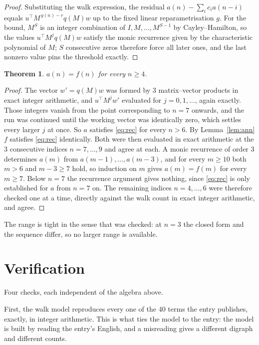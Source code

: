 \documentclass[11pt,a4paper]{article}
\theoremstyle{plain}
\newtheorem{theorem}{Theorem}
\theoremstyle{definition}
\begin{document}
\begin{proof}
Substituting the walk expression, the residual $a(n)-\sum_ic_ia(n-i)$ equals
$u^{\!\top}M^{\,g(n)-r}q(M)w$ up to the fixed linear reparametrisation $g$. For the bound,
$M^{S}$ is an integer combination of $I,M,\dots,M^{S-1}$ by Cayley--Hamilton, so the values
$u^{\!\top}M^{j}q(M)w$ satisfy the monic recurrence given by the characteristic polynomial of
$M$; $S$ consecutive zeros therefore force all later ones, and the last nonzero value pins the
threshold exactly.
\end{proof}

\begin{theorem}
$a(n)=f(n)$ for every $n\ge4$.
\end{theorem}

\begin{proof}
The vector $w'=q(M)w$ was formed by $3$ matrix--vector products in exact integer
arithmetic, and $u^{\!\top}M^{j}w'$ evaluated for $j=0,1,\dots$, again exactly. Those integers
vanish from the point corresponding to $n=7$ onwards, and the run was continued until the
working vector was identically zero, which settles every larger $j$ at once. So $a$ satisfies
\eqref{eq:rec} for every $n>6$. By Lemma~\ref{lem:ann} $f$ satisfies \eqref{eq:rec}
identically. Both were then evaluated in exact arithmetic at the $3$ consecutive indices
$n=7,\dots,9$ and agree at each. A monic recurrence of order $3$
determines $a(m)$ from $a(m-1),\dots,a(m-3)$, and for every $m\ge10$ both
$m>6$ and $m-3\ge7$ hold, so induction on $m$ gives $a(m)=f(m)$ for every
$m\ge7$.
Below $n=7$ the recurrence argument gives nothing, since \eqref{eq:rec} is only
established for $a$ from $n=7$ on. The remaining indices $n=4,\dots,6$ were
therefore checked one at a time, directly against the walk count in exact integer arithmetic,
and agree.
\end{proof}

The range is tight in the sense that was checked: at $n=3$ the closed form and the sequence differ, so no larger range is available.

\section{Verification}

Four checks, each independent of the algebra above.

First, the walk model reproduces every one of the $40$ terms the entry publishes,
exactly, in integer arithmetic. This is what ties the model to the entry: the model is built
by reading the entry's English, and a misreading gives a different digraph and different
counts.
\end{document}
